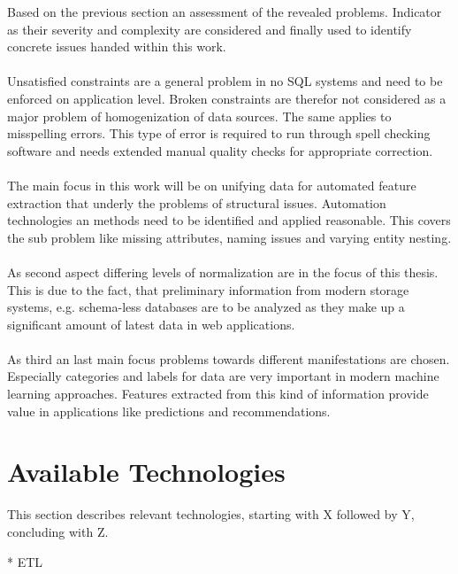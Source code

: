 Based on the previous section an assessment of the revealed problems. Indicator as their severity and complexity are considered and finally used to identify concrete issues handed within this work. 
\\\\
Unsatisfied constraints are a general problem in no SQL systems and need to be enforced on application level. Broken constraints are therefor not considered as a major problem of homogenization of data sources. The same applies to misspelling errors. This type of error is required to run through spell checking software and needs extended manual quality checks for appropriate correction. 
\\\\
The main focus in this work will be on unifying data for automated feature extraction that underly the problems of structural issues. Automation technologies an methods need to be identified and applied reasonable. This covers the sub problem like missing attributes, naming issues and varying entity nesting.
\\\\
As second aspect differing levels of normalization are in the focus of this thesis. This is due to the fact, that preliminary information from modern storage systems, e.g. schema-less databases are to be analyzed as they make up a significant amount of latest data in web applications.
\\\\
As third an last main focus problems towards different manifestations are chosen. Especially categories and labels for data are very important in modern machine learning approaches. Features extracted from this kind of information provide value in applications like predictions and recommendations.

\section{Available Technologies \label{sec:tech}}

This section describes relevant technologies, starting with X followed by Y, concluding with Z.

* ETL

